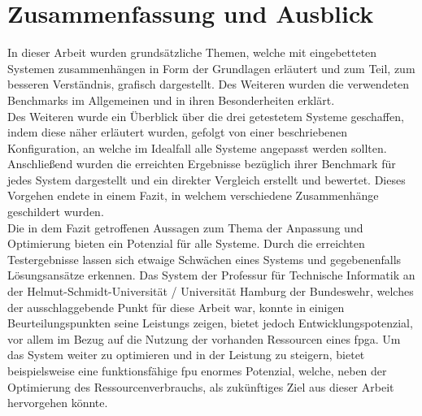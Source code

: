 \chapter{Zusammenfassung und Ausblick}\label{ch:schluss}
In dieser Arbeit wurden grundsätzliche Themen, welche mit eingebetteten Systemen zusammenhängen in Form der Grundlagen erläutert und zum Teil,
 zum besseren Verständnis, grafisch dargestellt. Des Weiteren wurden die verwendeten Benchmarks im Allgemeinen und in ihren Besonderheiten erklärt.\\
 Des Weiteren wurde ein Überblick über die drei getestetem Systeme geschaffen, indem diese näher erläutert wurden, gefolgt von einer beschriebenen Konfiguration,
 an welche im Idealfall alle Systeme angepasst werden sollten. Anschließend wurden die erreichten Ergebnisse bezüglich ihrer Benchmark für jedes
 System dargestellt und ein direkter Vergleich erstellt und bewertet. Dieses Vorgehen endete in einem Fazit, in welchem verschiedene Zusammenhänge geschildert wurden.\\
Die in dem Fazit getroffenen Aussagen zum Thema der Anpassung und Optimierung bieten ein Potenzial für alle Systeme. Durch die erreichten Testergebnisse lassen sich etwaige
Schwächen eines Systems und gegebenenfalls Lösungsansätze erkennen. Das System der Professur für Technische Informatik an der Helmut-Schmidt-Universität / Universität Hamburg
der Bundeswehr, welches der ausschlaggebende Punkt für diese Arbeit war, konnte in einigen Beurteilungspunkten seine Leistungs zeigen, bietet jedoch Entwicklungspotenzial,
vor allem im Bezug auf die Nutzung der vorhanden Ressourcen eines \ac{fpga}. Um das System weiter zu optimieren und in der Leistung zu steigern, bietet beispielsweise eine
funktionsfähige \ac{fpu} enormes Potenzial, welche, neben der Optimierung des Ressourcenverbrauchs, als zukünftiges Ziel aus dieser Arbeit hervorgehen könnte. 
